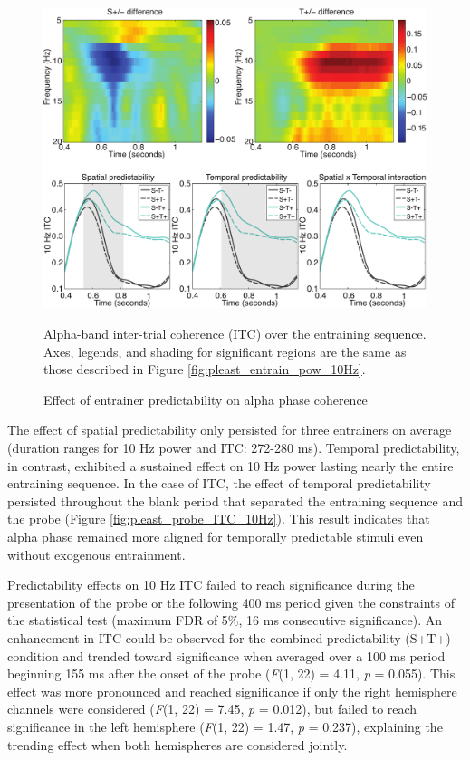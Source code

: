 \documentclass[dwyatte_dissertation.tex]{subfiles}
\begin{document}
\begin{figure}[h!]
\begin{center}
\includegraphics[width=160mm]{figs/chap_pleast/results_powphase_entrain_ITC_montage.pdf}
\end{center}
\caption{Effect of entrainer predictability on alpha phase coherence}{Alpha-band inter-trial coherence (ITC) over the entraining sequence. Axes, legends, and shading for significant regions are the same as those described in Figure \ref{fig:pleast_entrain_pow_10Hz}.}
\label{fig:pleast_entrain_ITC_10Hz}
\end{figure}

The effect of spatial predictability only persisted for three entrainers on average (duration ranges for 10 Hz power and ITC: 272-280 ms). Temporal predictability, in contrast, exhibited a sustained effect on 10 Hz power lasting nearly the entire entraining sequence. In the case of ITC, the effect of temporal predictability persisted throughout the blank period that separated the entraining sequence and the probe (Figure \ref{fig:pleast_probe_ITC_10Hz}). This result indicates that alpha phase remained more aligned for temporally predictable stimuli even without exogenous entrainment. 

Predictability effects on 10 Hz ITC failed to reach significance during the presentation of the probe or the following 400 ms period given the constraints of the statistical test (maximum FDR of 5\%, 16 ms consecutive significance). An enhancement in ITC could be observed for the combined predictability (S+T+) condition and trended toward significance when averaged over a 100 ms period beginning 155 ms after the onset of the probe (\textit{F}(1, 22) = 4.11, \textit{p} = 0.055). This effect was more pronounced and reached significance if only the right hemisphere channels were considered (\textit{F}(1, 22) = 7.45, \textit{p} = 0.012), but failed to reach significance in the left hemisphere (\textit{F}(1, 22) = 1.47, \textit{p} = 0.237), explaining the trending effect when both hemispheres are considered jointly. 
\end{document}
